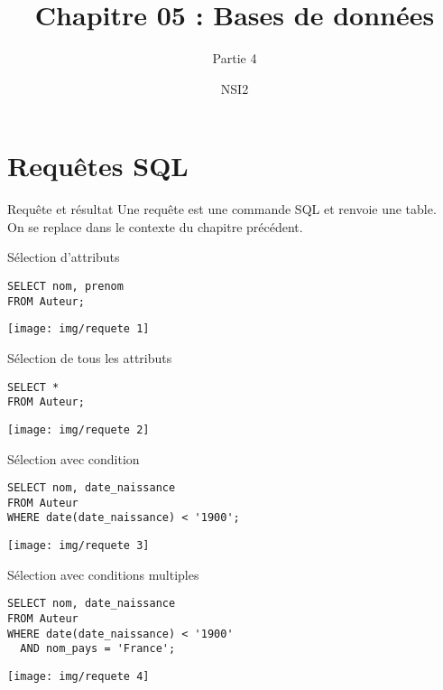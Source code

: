 \documentclass[10pt]{nsibeamer}
\title{Chapitre 05 : Bases de données}
\subtitle{Partie 4}
\author{NSI2}
\begin{document}
	\maketitle
    \section{Requêtes SQL}
\begin{frame}{Requête et résultat}
Une requête est une commande SQL et renvoie une table.\\
On se replace dans le contexte du chapitre précédent.
\end{frame}
\begin{frame}[fragile]{Sélection d'attributs}
	\begin{verbatim}
SELECT nom, prenom
FROM Auteur;
    \end{verbatim}
    \pause
    \begin{center}
    \texttt{[image: img/requete 1]}
    \end{center}
\end{frame}

\begin{frame}[fragile]{Sélection de tous les attributs}
	\begin{verbatim}
SELECT *
FROM Auteur;
    \end{verbatim}
    \pause
    \begin{center}
    \texttt{[image: img/requete 2]}
    \end{center}
\end{frame}

\begin{frame}[fragile]{Sélection avec condition}
	\begin{verbatim}
SELECT nom, date_naissance
FROM Auteur
WHERE date(date_naissance) < '1900';
    \end{verbatim}
    \pause
    \begin{center}
    \texttt{[image: img/requete 3]}
    \end{center}
\end{frame}

\begin{frame}[fragile]{Sélection avec conditions multiples}
	\begin{verbatim}
SELECT nom, date_naissance
FROM Auteur
WHERE date(date_naissance) < '1900'
  AND nom_pays = 'France';
    \end{verbatim}
    \pause
    \begin{center}
    \texttt{[image: img/requete 4]}
    \end{center}
\end{frame}
\end{document}
